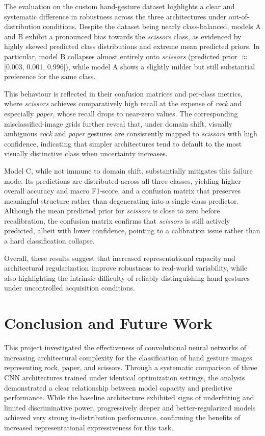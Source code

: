 \documentclass{article}
\begin{document}
The evaluation on the custom hand-gesture dataset highlights a clear and
systematic difference in robustness across the three architectures under
out-of-distribution conditions. Despite the dataset being nearly
class-balanced, models A and B exhibit a pronounced bias towards the
\emph{scissors} class, as evidenced by highly skewed predicted class
distributions and extreme mean predicted priors. In particular, model B
collapses almost entirely onto \emph{scissors} (predicted prior $\approx$
{[}0.003, 0.001, 0.996{]}), while model A shows a slightly milder but
still substantial preference for the same class.

This behaviour is reflected in their confusion matrices and per-class
metrics, where \emph{scissors} achieves comparatively high recall at the
expense of \emph{rock} and especially \emph{paper}, whose recall drops
to near-zero values. The corresponding misclassified-image grids further
reveal that, under domain shift, visually ambiguous \emph{rock} and
\emph{paper} gestures are consistently mapped to \emph{scissors} with
high confidence, indicating that simpler architectures tend to default
to the most visually distinctive class when uncertainty increases.

Model C, while not immune to domain shift, substantially mitigates this
failure mode. Its predictions are distributed across all three classes,
yielding higher overall accuracy and macro F1-score, and a confusion
matrix that preserves meaningful structure rather than degenerating into
a single-class predictor. Although the mean predicted prior for
\emph{scissors} is close to zero before recalibration, the confusion
matrix confirms that \emph{scissors} is still actively predicted, albeit
with lower confidence, pointing to a calibration issue rather than a
hard classification collapse.

Overall, these results suggest that increased representational capacity
and architectural regularization improve robustness to real-world
variability, while also highlighting the intrinsic difficulty of
reliably distinguishing hand gestures under uncontrolled acquisition
conditions.

\section{Conclusion and Future Work}

This project investigated the effectiveness of convolutional neural
networks of increasing architectural complexity for the classification
of hand gesture images representing rock, paper, and scissors. Through a
systematic comparison of three CNN architectures trained under identical
optimization settings, the analysis demonstrated a clear relationship
between model capacity and predictive performance. While the baseline
architecture exhibited signs of underfitting and limited discriminative
power, progressively deeper and better-regularized models achieved very
strong in-distribution performance, confirming the benefits of increased
representational expressiveness for this task.
\end{document}
